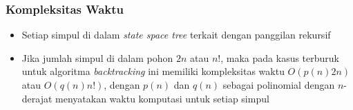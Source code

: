 \documentclass{beamer}
\begin{document}
\begin{frame}
\frametitle{Kompleksitas Waktu}
\begin{itemize}
\item Setiap simpul di dalam \textit{state space tree} terkait dengan panggilan rekursif
\item Jika jumlah simpul di dalam pohon \begin{math}2n\end{math} atau \begin{math}n!\end{math}, maka pada kasus terburuk untuk algoritma \textit{backtracking} ini memiliki kompleksitas waktu \begin{math}O(p(n)2n)\end{math} atau \begin{math}O(q(n)n!)\end{math}, dengan \begin{math}p(n)\end{math} dan \begin{math}q(n)\end{math} sebagai polinomial dengan \begin{math}n\end{math}-derajat menyatakan waktu komputasi untuk setiap simpul
\end{itemize}
\end{frame}

\end{document}
